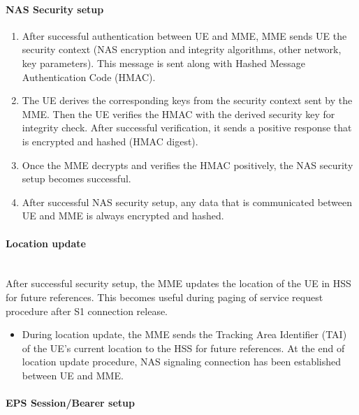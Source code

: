 \documentclass[hidelinks]{report}
\begin{document}
\paragraph*{NAS Security setup}

\begin{enumerate}

\item After successful authentication between UE and MME, MME sends UE the security context (NAS encryption and integrity algorithms, other network, key parameters). This message is sent along with Hashed Message Authentication Code (HMAC).

\item The UE derives the corresponding keys from the security context sent by the MME. Then the UE verifies the HMAC with the derived security key for integrity check. After successful verification, it sends a positive response that is encrypted and hashed (HMAC digest). 

\item Once the MME decrypts and verifies the HMAC positively, the NAS security setup becomes successful. 

\item After successful NAS security setup, any data that is communicated between UE and MME is always encrypted and hashed.

\end{enumerate}

\paragraph*{Location update}

~\\ After successful security setup, the MME updates the location of the UE in HSS for future references. This becomes useful during paging of service request procedure after S1 connection release.

\begin{itemize}

\item During location update, the MME sends the Tracking Area Identifier (TAI) of the UE's current location to the HSS for future references. At the end of location update procedure, NAS signaling connection has been established between UE and MME.

\end{itemize}

\paragraph*{EPS Session/Bearer setup}
\end{document}

